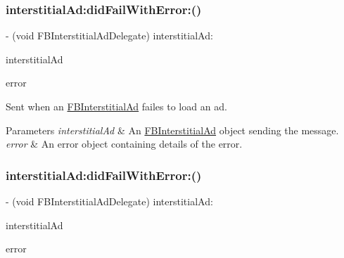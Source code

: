 \subsubsection{\texorpdfstring{interstitial\+Ad\+:did\+Fail\+With\+Error\+:()}{interstitialAd:didFailWithError:()}\hspace{0.1cm}{\footnotesize\ttfamily [4/5]}}
{\footnotesize\ttfamily -\/ (void F\+B\+Interstitial\+Ad\+Delegate) interstitial\+Ad\+: \begin{DoxyParamCaption}\item[{(\hyperlink{interfaceFBInterstitialAd}{F\+B\+Interstitial\+Ad} $\ast$)}]{interstitial\+Ad }\item[{didFailWithError:(N\+S\+Error $\ast$)}]{error }\end{DoxyParamCaption}\hspace{0.3cm}{\ttfamily [optional]}}

Sent when an \hyperlink{interfaceFBInterstitialAd}{F\+B\+Interstitial\+Ad} failes to load an ad.


\begin{DoxyParams}{Parameters}
{\em interstitial\+Ad} & An \hyperlink{interfaceFBInterstitialAd}{F\+B\+Interstitial\+Ad} object sending the message. \\
\hline
{\em error} & An error object containing details of the error. \\
\hline
\end{DoxyParams}
\mbox{\label{protocolFBInterstitialAdDelegate_01-p_a55d38d3ba346d2251fe10cec24023da7}} 
\subsubsection{\texorpdfstring{interstitial\+Ad\+:did\+Fail\+With\+Error\+:()}{interstitialAd:didFailWithError:()}\hspace{0.1cm}{\footnotesize\ttfamily [5/5]}}
{\footnotesize\ttfamily -\/ (void F\+B\+Interstitial\+Ad\+Delegate) interstitial\+Ad\+: \begin{DoxyParamCaption}\item[{(\hyperlink{interfaceFBInterstitialAd}{F\+B\+Interstitial\+Ad} $\ast$)}]{interstitial\+Ad }\item[{didFailWithError:(N\+S\+Error $\ast$)}]{error }\end{DoxyParamCaption}\hspace{0.3cm}{\ttfamily [optional]}}

